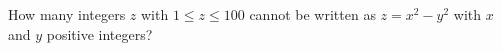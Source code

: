 How many integers $z$ with $1\le z\le100$ cannot be written as $z=x^2-y^2$ with $x$ and $y$ positive integers?
